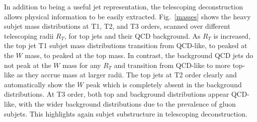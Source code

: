 \documentclass[notoc]{JHEP3}
\DeclareRobustCommand{\Fig}[1]{Fig.~\ref{#1}}
\begin{document}
In addition to being a useful jet representation, the telescoping deconstruction allows physical information to be easily extracted. \Fig{masses} shows the heavy subjet mass \cite{Chien:2010kc} distributions at T1, T2, and T3 orders, scanned over different telescoping radii $R_T$, for top jets and their QCD background. As $R_T$ is increased, the top jet T1 subjet mass distributions transition from QCD-like, to peaked at the $W$ mass, to peaked at the top mass. In contrast, the background QCD jets do not peak at the $W$ mass for any $R_T$ and transition from QCD-like to more top-like as they %
accrue mass at larger radii. The top jets at T2 order clearly and automatically show the $W$ peak which is completely absent in the background distributions. At T3 order, both top and background distributions appear QCD-like, with the wider background distributions %
due to the prevalence of gluon subjets. This highlights again subjet substructure in telescoping deconstruction.



\end{document}
